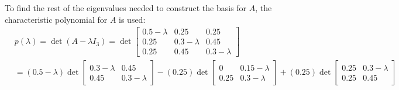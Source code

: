 \documentclass[12pt]{article}
\begin{document}
\noindent To find the rest of the eigenvalues needed to construct the basis for $A$, the characteristic polynomial for $A$ is used:
\begin{align*}
      &p(\lambda) = \det(A-\lambda I_3) = 
    \det\begin{bmatrix}
        0.5 - \lambda & 0.25 & 0.25 \\
        0.25 & 0.3 - \lambda & 0.45 \\
        0.25 & 0.45 & 0.3 - \lambda 
    \end{bmatrix}\\
    &= (0.5- \lambda) \det\begin{bmatrix}
       0.3 - \lambda & 0.45 \\
        0.45 & 0.3 -\lambda
    \end{bmatrix} - (0.25) \det\begin{bmatrix}
        0 & 0.15 - \lambda \\
        0.25 & 0.3 - \lambda
    \end{bmatrix} + (0.25)\det\begin{bmatrix}
        0.25 & 0.3 - \lambda \\
        0.25 & 0.45
    \end{bmatrix}
\end{align*}
\end{document}
